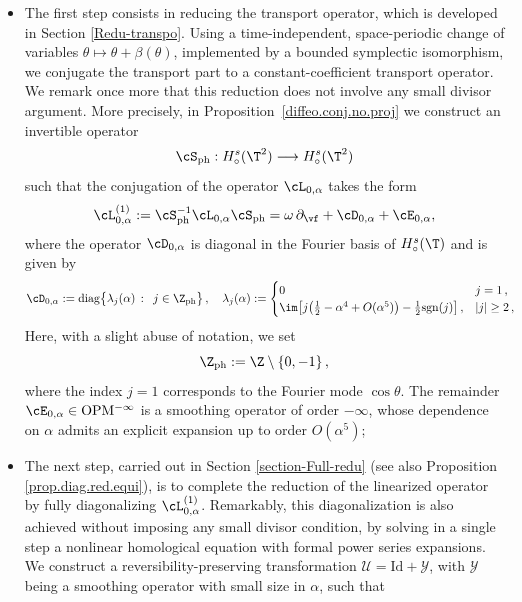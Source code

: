 \documentclass[a4paper,reqno,10pt]{article}
\newcommand{\pa}{\partial}
\newcommand{\OpM}{{\rm O}{\rm P}{\rm M}}
\begin{document}
\begin{itemize}
\item[1)] The first step consists in reducing the transport operator, which is developed in Section \ref{Redu-transpo}. 
Using a time-independent, space-periodic change of variables 
$\theta \mapsto \theta + \beta(\theta)$, implemented by a bounded symplectic 
isomorphism, we conjugate the transport part to a constant-coefficient 
transport operator. 
We remark once more that this reduction does not involve any 
small divisor argument. More precisely, in Proposition~\ref{diffeo.conj.no.proj}
we construct an invertible operator
\[
\cS_{\rm ph} : H_\circ^s(\T^2) \longrightarrow H_\circ^s(\T^2)
\]
such that the conjugation of the  operator $\cL_{0,\alpha}$ takes the form
        $$
	\cL_{0,\alpha}^{(1)}  := 	\cS_{\rm ph}^{-1} \cL_{0,\alpha} \cS_{\rm ph}=\omega\,\pa_{\vf} + \cD_{0,\alpha}+ \cE_{0,\alpha},
	$$
where the operator $\cD_{0,\alpha}$ is diagonal in the Fourier basis of $H_\circ^s(\T)$ and is given by 
	\begin{equation*}
		\begin{aligned}
\cD_{0,\alpha} :=  {\rm diag}\big\{ \lambda_{j}(\alpha) \,: \,\ j \in \Z_{\rm ph} \big\}\,, \quad \lambda_{j}(\alpha)  &:= \begin{cases}
            0 & j=1\,, \\
			    \im \big[j\big(\tfrac12 - \alpha^4 + O(\alpha^5)\big)
- \tfrac12 {\rm sgn}(j) \big]\,, &  |j|\geq 2 \,,
			\end{cases} 
		\end{aligned}
	\end{equation*}
   Here, with a slight abuse of notation, we set
    \begin{equation}
        \Z_{\rm ph} := \Z \setminus \{0,-1\} \,,
    \end{equation}
    where the index \(j=1\) corresponds to the Fourier mode
\(\cos\theta\).
    The remainder $\cE_{0,\alpha} \in \OpM^{-\infty}$ is a smoothing operator
of order $-\infty$, whose dependence on $\alpha$ admits an explicit expansion
up to order $O(\alpha^5)$;
\item[2)]  The next step, carried out in Section \ref{section-Full-redu} (see also Proposition \ref{prop.diag.red.equi}), is to complete the reduction of the linearized operator by fully diagonalizing $\cL_{0,\alpha}^{(1)}$. Remarkably, this diagonalization is also  achieved without imposing any small divisor condition, by solving in a single step a nonlinear homological equation with formal power series expansions. We construct  a reversibility-preserving transformation  $\mathcal{U} = \mathrm{Id} + \mathcal{Y}$, with $\mathcal{Y}$ being a smoothing operator with small size in $\alpha$, such that

\end{itemize}
\end{document}
